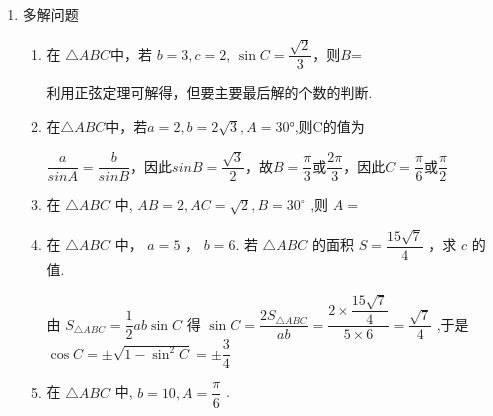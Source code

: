 \begin{enumerate}
\begin{enumerate}
\begin{jieda}
        \end{jieda}
    \end{enumerate}
\item 多解问题
\begin{enumerate}
    \item 在 $\triangle{ABC}$中，若 $b=3, c=2$, $\sin C=\dfrac{\sqrt{2}}{3}$，则$B$=
    \begin{jieda}
        利用正弦定理可解得，但要主要最后解的个数的判断.
    \end{jieda}
    \item 在$\triangle{ABC}$中，若$a=2,b=2\sqrt{3},A=\ang{30}$,则C的值为
    \begin{jieda}
        $\dfrac{a}{sinA} = \dfrac{b}{sinB}$，因此$sinB = \dfrac{\sqrt{3}}{2}$，故$B = \dfrac{\pi}{3}$或$\dfrac{2\pi}{3}$，因此$C = $$\dfrac{\pi}{6}$或$\dfrac{\pi}{2}$
    \end{jieda}    
    \item 在 $\bigtriangleup  {ABC}$ 中, ${AB} = 2,{AC} = \sqrt{2},B = {30}^{ \circ  }$ ,则 $A =$
    \item 在 $\bigtriangleup  {ABC}$ 中， $a = 5$ ， $b = 6$. 若 $\bigtriangleup  {ABC}$ 的面积 $S = \dfrac{{15}\sqrt{7}}{4}$ ，求 $c$ 的值.
    \begin{jieda}
        由 ${S}_{\bigtriangleup {ABC}} = \dfrac{1}{2}{ab}\sin C$ 得 $\sin C = \dfrac{2{S}_{\bigtriangleup {ABC}}}{ab} = \dfrac{2 \times  \dfrac{{15}\sqrt{7}}{4}}{5 \times  6} =  \dfrac{\sqrt{7}}{4}$ ,于是 $\cos C =  \pm  \sqrt{1 - {\sin }^{2}C} =  \pm  \dfrac{3}{4}$
    \end{jieda}
    \item 在 $\bigtriangleup {ABC}$ 中, $b = {10},A = \dfrac{\pi }{6}$ .
\end{enumerate}
\end{enumerate}
